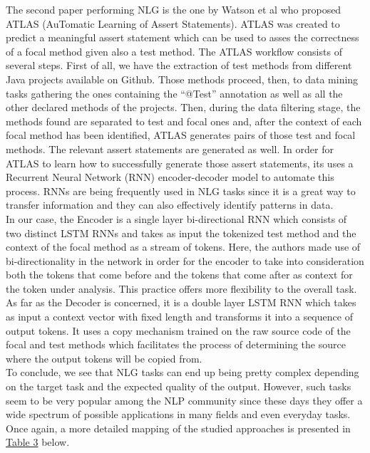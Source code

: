 The second paper performing NLG is the one by Watson et al \cite{9283916} who proposed ATLAS (AuTomatic Learning of Assert Statements). ATLAS was created to predict a meaningful assert statement which can be 
used to asses the correctness of a focal method given also a test method. The ATLAS workflow consists of several steps. First of all, we have the extraction of test methods from different Java projects available 
on Github. Those methods proceed, then, to data mining tasks gathering the ones containing the ``@Test'' annotation as well as all the other declared methods of the projects. Then, during the data filtering 
stage, the methods found are separated to test and focal ones and, after the context of each focal method has been identified, ATLAS generates pairs of those test and focal methods. The relevant assert statements 
are generated as well. In order for ATLAS to learn how to successfully generate those assert statements, its uses a Recurrent Neural Network (RNN) encoder-decoder model to automate this process. RNNs are 
being frequently used in NLG tasks since it is a great way to transfer information and they can also effectively identify patterns in data.\\

In our case, the Encoder is a single layer bi-directional RNN which consists of two distinct LSTM RNNs and takes as input the tokenized test method and the context of the focal method as a stream of tokens. 
Here, the authors made use of bi-directionality in the network in order for the encoder to take into consideration both the tokens that come before and the tokens that come after as context for the token 
under analysis. This practice offers more flexibility to the overall task.\\
As far as the Decoder is concerned, it is a double layer LSTM RNN which takes as input a context vector with fixed length and transforms it into a sequence of output tokens. It uses a copy mechanism trained 
on the raw source code of the focal and test methods which facilitates the process of determining the source where the output tokens will be copied from.\\

To conclude, we see that NLG tasks can end up being pretty complex depending on the target task and the expected quality of the output. However, such tasks seem to be very popular among the NLP community 
since these days they offer a wide spectrum of possible applications in many fields and even everyday tasks. Once again, a more detailed mapping of the studied approaches is presented 
in \hyperref[table3]{Table 3} below.

